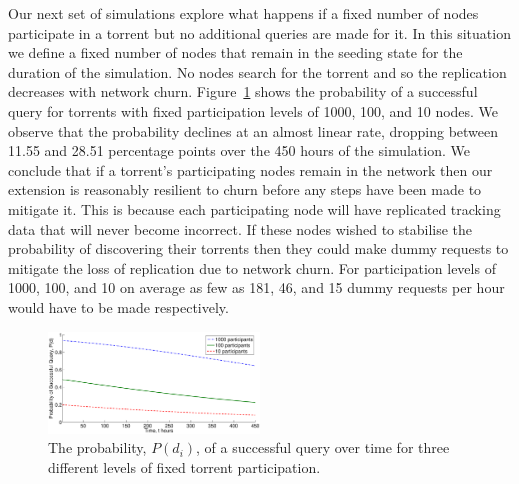 Our next set of simulations explore what happens if a fixed number of nodes participate in a torrent but no additional queries are made for it. In this situation we define a fixed number of nodes that remain in the seeding state for the duration of the simulation. No nodes search for the torrent and so the replication decreases with network churn. Figure~\ref{fig:probability_constant_static} shows the probability of a successful query for torrents with fixed participation levels of 1000, 100, and 10 nodes. We observe that the probability declines at an almost linear rate, dropping between 11.55 and 28.51 percentage points over the 450 hours of the simulation. We conclude that if a torrent's participating nodes remain in the network then our extension is reasonably resilient to churn before any steps have been made to mitigate it. This is because each participating node will have replicated tracking data that will never become incorrect. If these nodes wished to stabilise the probability of discovering their torrents then they could make dummy requests to mitigate the loss of replication due to network churn. For participation levels of 1000, 100, and 10 on average as few as 181, 46, and 15 dummy requests per hour would have to be made respectively.

\begin{figure}[t]
    \centering
    \includegraphics[width=0.5\textwidth]{Images/ProbabilityConstantStatic.eps}
    \caption{The probability, $P(d_i)$, of a successful query over time for three different levels of fixed torrent participation.}
    \label{fig:probability_constant_static}
\end{figure}

